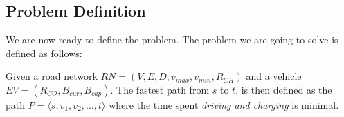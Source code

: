 \subsection{Problem Definition} %
\label{sub:problem_definition}
We are now ready to define the problem. The problem we are going to solve is defined as follows:
\begin{newdef}
Given a road network $RN=(V,E,D,v_{max},v_{min},R_{CH})$ and a vehicle $EV=(R_{CO},B_{cur},B_{cap})$. The fastest path from $s$ to $t$, is then defined as the path $P = \langle s,v_1,v_2,\dots,t \rangle$ where the time spent \emph{driving and charging} is minimal.
\end{newdef}


